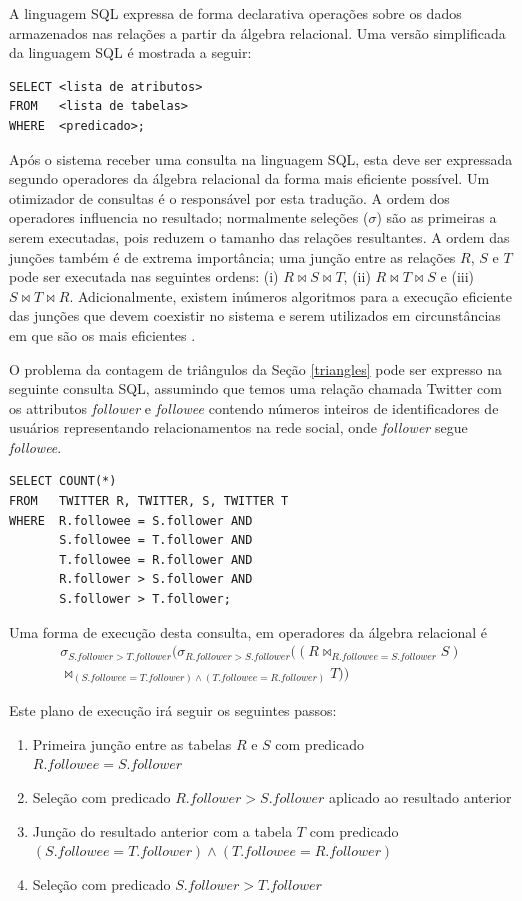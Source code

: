 A linguagem SQL expressa de forma declarativa operações sobre os dados
armazenados nas relações a partir da álgebra relacional. Uma versão simplificada
da linguagem SQL é mostrada a seguir:

\begin{lstlisting}[style=MySQLStyle]
SELECT <lista de atributos>
FROM   <lista de tabelas>
WHERE  <predicado>;
\end{lstlisting}

Após o sistema receber uma consulta na linguagem SQL, esta deve ser expressada
segundo operadores da álgebra relacional da forma mais eficiente possível. Um 
otimizador de consultas é o responsável por esta tradução. A ordem dos operadores
influencia no resultado; normalmente seleções ($\sigma$) são as primeiras a serem
executadas, pois reduzem o tamanho das relações resultantes. A ordem das junções
também é de extrema importância; uma junção entre as relações $R$, $S$ e $T$ pode
ser executada nas seguintes ordens: (i) $R \bowtie S \bowtie T$, (ii) 
$R \bowtie T \bowtie S$ e (iii) $S \bowtie T \bowtie R$. Adicionalmente, existem
inúmeros algoritmos para a execução eficiente das junções que devem coexistir no
sistema e serem utilizados em circunstâncias em que são os mais eficientes 
\cite{Mishra1992}.

O problema da contagem de triângulos da Seção \ref{triangles} pode ser expresso na 
seguinte consulta SQL, assumindo que temos uma relação chamada Twitter com os attributos
\emph{follower} e \emph{followee} contendo números inteiros de identificadores de usuários
representando relacionamentos na rede social, onde \emph{follower} segue \emph{followee}.

\begin{lstlisting}[style=MySQLStyle]
SELECT COUNT(*) 
FROM   TWITTER R, TWITTER, S, TWITTER T
WHERE  R.followee = S.follower AND
       S.followee = T.follower AND
       T.followee = R.follower AND
       R.follower > S.follower AND
       S.follower > T.follower;
\end{lstlisting}

Uma forma de execução desta consulta, em operadores da álgebra relacional é 
\begin{multline}
\sigma_{S.follower > T.follower}(\sigma_{R.follower > S.follower}(( R \bowtie_{R.followee = S.follower} S ) \\
\bowtie_{(S.followee = T.follower) \land (T.followee = R.follower)} T))
\end{multline}

Este plano de execução irá seguir os seguintes passos:

\begin{enumerate}
\item Primeira junção entre as tabelas $R$ e $S$ com predicado $R.followee = S.follower$
\item Seleção com predicado $R.follower > S.follower$ aplicado ao resultado anterior
\item Junção do resultado anterior com a tabela $T$ com predicado $(S.followee = T.follower) \land (T.followee = R.follower)$
\item Seleção com predicado $S.follower > T.follower$
\end{enumerate}

